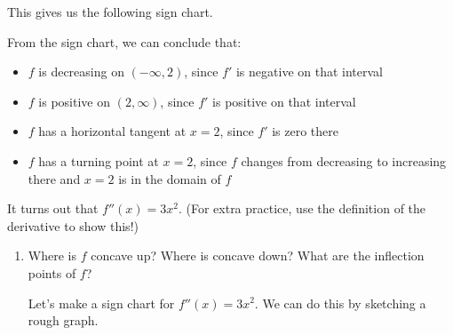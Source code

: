 \documentclass{article}
\begin{document}
\begin{enumerate}
\begin{enumerate}
\begin{solution}
      This gives us the following sign chart.

      \begin{center}
      \end{center}

      From the sign chart, we can conclude that:
      \begin{itemize}
        \item $f$ is decreasing on $(-\infty, 2)$, since $f'$ is negative on that interval
        \item $f$ is positive on $(2, \infty)$, since $f'$ is positive on that interval
        \item $f$ has a horizontal tangent at $x=2$, since $f'$ is zero there
        \item $f$ has a turning point at $x=2$, since $f$ changes from decreasing to increasing there and $x=2$
          is in the domain of $f$
      \end{itemize}
    \end{solution}
  \end{enumerate}

  It turns out that $f''(x) = 3x^2$. (For extra practice, use the definition of the derivative to show this!)

  \begin{enumerate}[resume]

  \item


    \begin{problem}[\vfill]
      Where is $f$ concave up? Where is concave down? What are the inflection points of $f$? 
    \end{problem}

    \begin{solution}
      Let's make a sign chart for $f''(x)=3x^2$. We can do this by sketching a rough graph.
      \begin{center}
      \end{center}


\end{solution}
\end{enumerate}
\end{enumerate}
\end{document}
